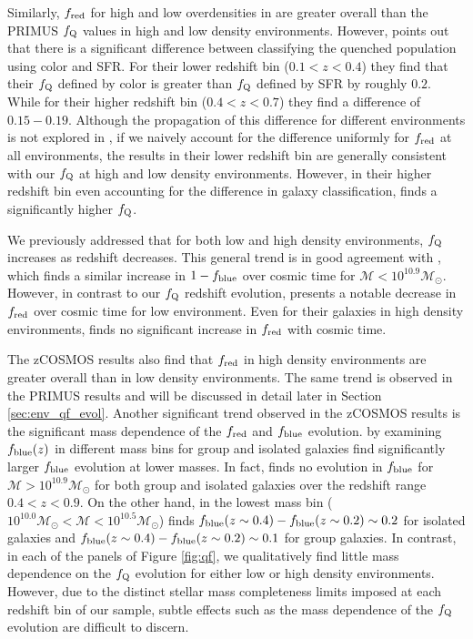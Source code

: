\documentclass{emulateapj}
\begin{document}
Similarly, $f_{\rm{red}}$ for high and low overdensities in \cite{Kovac:2014aa} are  greater overall than the PRIMUS $f_{\rm{Q}}$ values in high and low density environments. However, \cite{Kovac:2014aa} points out that there is a significant difference between classifying the quenched population using color and SFR. For their lower redshift bin ($0.1 < z < 0.4$) they find that their $f_{\rm{Q}}$ defined by color is greater than $f_{\rm{Q}}$ defined by SFR by roughly $0.2$. While for their higher redshift bin ($0.4 < z < 0.7$) they find a difference of $0.15-0.19$. Although the propagation of this difference for different environments is not explored in \cite{Kovac:2014aa}, if we naively account for the difference uniformly for $f_{\rm{red}}$ at all environments, the \cite{Kovac:2014aa} results in their lower redshift bin are generally consistent with our $f_{\rm{Q}}$ at high and low density environments. However, in their higher redshift bin even accounting for the difference in galaxy classification, \cite{Kovac:2014aa} finds a significantly higher $f_{\rm{Q}}$. 

We previously addressed that for both low and high density environments, $f_{\rm{Q}}$ increases as redshift decreases. This general trend is in good agreement with \cite{Iovino:2010aa}, which finds a similar increase in $1-f_{\rm{blue}}$ over cosmic time for $\mathcal{M} < 10^{10.9} \mathcal{M}_{\odot}$. However, in contrast to our $f_{\rm{Q}}$ redshift evolution, \cite{Kovac:2014aa} presents a notable decrease in $f_{\rm{red}}$ over cosmic time for low environment. Even for their galaxies in high density environments, \cite{Kovac:2014aa} finds no significant increase in $f_{\rm{red}}$ with cosmic time. 

The zCOSMOS results also find that $f_{\rm{red}}$ in high density environments are greater overall than in low density environments. The same trend is observed in the PRIMUS results and will be discussed in detail later in Section \ref{sec:env_qf_evol}. Another significant trend observed in the zCOSMOS results is the significant mass dependence of the $f_{\rm{red}}$ and $f_{\rm{blue}}$ evolution. \cite{Iovino:2010aa} by examining $f_{\rm{blue}}(z)$ in different mass bins for group and isolated galaxies find significantly larger $f_{\rm{blue}}$ evolution at lower masses. In fact, \cite{Iovino:2010aa} finds no evolution in $f_{\rm{blue}}$ for $\mathcal{M} > 10^{10.9} \mathcal{M}_{\odot}$ for both group and isolated galaxies over the redshift range $0.4 < z < 0.9$. On the other hand, in the lowest mass bin ($10^{10.0} \mathcal{M}_{\odot} < \mathcal{M} < 10^{10.5} \mathcal{M}_{\odot}$) \cite{Iovino:2010aa} finds $f_{\rm{blue}}(z \sim 0.4) - f_{\rm{blue}}(z \sim 0.2) \sim 0.2$ for isolated galaxies and  $f_{\rm{blue}}(z \sim 0.4) - f_{\rm{blue}}(z \sim 0.2) \sim 0.1$ for group galaxies. In contrast, in each of the panels of Figure \ref{fig:qf}, we qualitatively find little mass dependence on the $f_{\rm{Q}}$ evolution for either low or high density environments. However, due to the distinct stellar mass completeness limits imposed at each redshift bin of our sample, subtle effects such as the mass dependence of the $f_{\rm{Q}}$ evolution are difficult to discern. 
\end{document}
